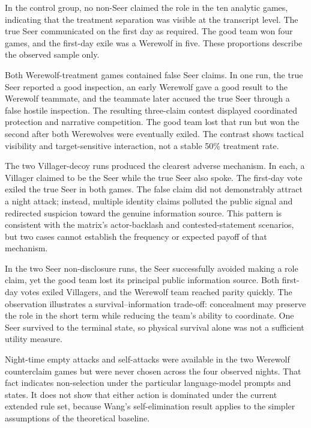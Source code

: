 \documentclass[11pt,a4paper]{article}
\begin{document}
In the control group, no non-Seer claimed the role in the ten analytic games, indicating that the treatment separation was visible at the transcript level. The true Seer communicated on the first day as required. The good team won four games, and the first-day exile was a Werewolf in five. These proportions describe the observed sample only.

Both Werewolf-treatment games contained false Seer claims. In one run, the true Seer reported a good inspection, an early Werewolf gave a good result to the Werewolf teammate, and the teammate later accused the true Seer through a false hostile inspection. The resulting three-claim contest displayed coordinated protection and narrative competition. The good team lost that run but won the second after both Werewolves were eventually exiled. The contrast shows tactical visibility and target-sensitive interaction, not a stable 50\% treatment rate.

The two Villager-decoy runs produced the clearest adverse mechanism. In each, a Villager claimed to be the Seer while the true Seer also spoke. The first-day vote exiled the true Seer in both games. The false claim did not demonstrably attract a night attack; instead, multiple identity claims polluted the public signal and redirected suspicion toward the genuine information source. This pattern is consistent with the matrix's actor-backlash and contested-statement scenarios, but two cases cannot establish the frequency or expected payoff of that mechanism.

In the two Seer non-disclosure runs, the Seer successfully avoided making a role claim, yet the good team lost its principal public information source. Both first-day votes exiled Villagers, and the Werewolf team reached parity quickly. The observation illustrates a survival--information trade-off: concealment may preserve the role in the short term while reducing the team's ability to coordinate. One Seer survived to the terminal state, so physical survival alone was not a sufficient utility measure.

Night-time empty attacks and self-attacks were available in the two Werewolf counterclaim games but were never chosen across the four observed nights. That fact indicates non-selection under the particular language-model prompts and states. It does not show that either action is dominated under the current extended rule set, because Wang's self-elimination result applies to the simpler assumptions of the theoretical baseline.
\end{document}
